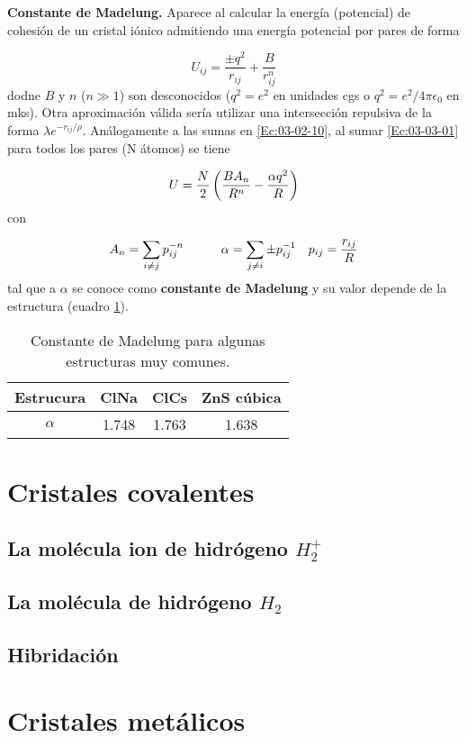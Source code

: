 \textbf{Constante de Madelung.} Aparece al calcular la energía (potencial) de cohesión de un cristal iónico admitiendo una energía potencial por pares de forma 

\begin{equation}
    U_{ij} = \frac{\pm q^2}{r_{ij}} + \frac{B}{r_{ij}^n} \label{Ec:03-03-01}
\end{equation} 
dodne $B$ y $n$ ($n\gg 1$) son desconocidos ($q^2 = e^2$ en unidades cgs o $q^2=e^2 / 4 \pi \epsilon_0$ en mks). Otra aproximación válida sería utilizar una intersección repulsiva de la forma $\lambda e^{-r_{ij}/\rho}$. Análogamente a las sumas en \ref{Ec:03-02-10}, al sumar \ref{Ec:03-03-01} para todos los pares (N átomos) se tiene 

\begin{equation}
    U = \frac{N}{2} \left( \frac{BA_n}{R^n}-\frac{\alpha q^2}{R} \right)
\end{equation}
con 

\begin{equation}
    A_n = \sum_{i\neq j} p_{ij}^{-n} \quad \quad \quad \alpha = \sum_{j \neq i} \pm p_{ij}^{-1} \quad p_{ij} = \frac{r_{ij}}{R}
\end{equation}
tal que a $\alpha$ se conoce como \textbf{constante de Madelung} y su valor depende de la estructura (cuadro \ref{Tab:03-02}).

\begin{table}[h!] \centering
    \begin{tabular}{c|ccc}
        Estrucura & ClNa & ClCs & ZnS cúbica \\ \hline
        $\alpha$ & 1.748 & 1.763 & 1.638 
    \end{tabular}
    \caption{Constante de Madelung para algunas estructuras muy comunes.}
    \label{Tab:03-02}
\end{table}

    
\section{Cristales covalentes}

\subsection{La molécula ion de hidrógeno $H_2^+$}
\subsection{La molécula de hidrógeno $H_2$}
\subsection{Hibridación}

\section{Cristales metálicos}